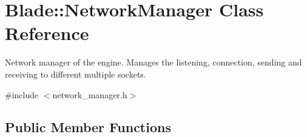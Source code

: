 \hypertarget{class_blade_1_1_network_manager}{}\section{Blade\+:\+:Network\+Manager Class Reference}
\label{class_blade_1_1_network_manager}


Network manager of the engine. Manages the listening, connection, sending and receiving to different multiple sockets.  




{\ttfamily \#include $<$network\+\_\+manager.\+h$>$}

\subsection*{Public Member Functions}
